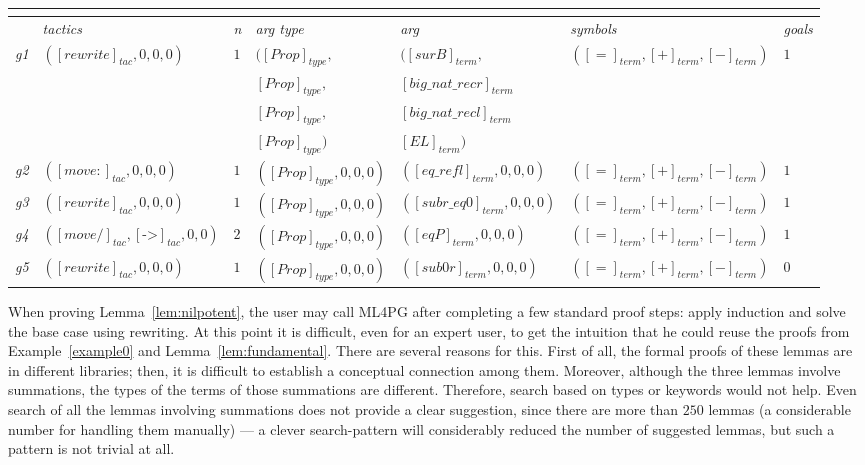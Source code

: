 \begin{table}
{{\begin{tabular}{|l||l|l|l|l|l|l|}
 \multicolumn{7}{c}{}\\
 \hline
 & \emph{tactics} & \emph{n} & \emph{arg type} & \emph{arg} & \emph{symbols} & \emph{goals} \\
\hline
\hline
\emph{g1}&  $([rewrite]_{tac},0,0,0)$ & $1$  & $([Prop]_{type},$ & $([surB]_{term},$  & $([=]_{term},[+]_{term},[-]_{term})$& $1$ \\
 & & & $[Prop]_{type},$ & $[big\_nat\_recr]_{term}$ & & \\
 & & & $[Prop]_{type},$& $[big\_nat\_recl]_{term}$ & & \\
 & & & $[Prop]_{type})$& $[EL]_{term})$ & & \\
 \hline
  \emph{g2} & $([move:]_{tac},0,0,0)$ & $1$  & $([Prop]_{type},0,0,0)$ &  $([eq\_refl]_{term},0,0,0)$  & $([=]_{term},[+]_{term},[-]_{term})$ & $1$ \\
 \hline
  \emph{g3} & $([rewrite]_{tac},0,0,0)$ & $1$  & $([Prop]_{type},0,0,0)$  & $([subr\_eq0]_{term},0,0,0)$ & $([=]_{term},[+]_{term},[-]_{term})$ & $1$ \\
 \hline
\emph{g4}& $([move/]_{tac},[\texttt{->}]_{tac},0,0)$ & $2$  & $([Prop]_{type},0,0,0)$  & $([eqP]_{term},0,0,0)$ & $([=]_{term},[+]_{term},[-]_{term})$ & $1$ \\
 \hline
  \emph{g5} & $([rewrite]_{tac},0,0,0)$ & $1$  & $([Prop]_{type},0,0,0)$  & $([sub0r]_{term},0,0,0)$ & $([=]_{term},[+]_{term},[-]_{term})$ & $0$ \\
 \hline
  \end{tabular}
  }}
 \end{table}


When proving Lemma~\ref{lem:nilpotent}, the user may call ML4PG after completing a few standard proof steps: apply induction and solve the base case using rewriting.
At this point it is difficult, even for an expert user,
to get the intuition that he could reuse the proofs from Example~\ref{example0} and Lemma~\ref{lem:fundamental}. There are several reasons for this.
First of all, the formal proofs of these lemmas are in different libraries; then, it is difficult to establish a conceptual connection among them. Moreover,
although the three lemmas involve summations,
the types of the terms of those summations are different. Therefore, search based on types or keywords would not help. Even search
of all the lemmas involving summations does not provide a clear suggestion, since there are more than $250$ lemmas (a considerable number for handling them manually) --- a clever search-pattern will considerably reduced the number of suggested lemmas, but such a pattern is not trivial at all.




